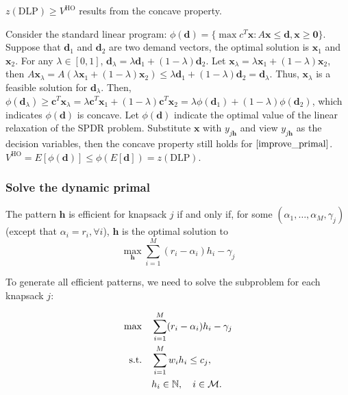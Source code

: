 \begin{lem}
$z(\text{DLP}) \geq V^{\text{HO}}$ results from the concave property. 
\end{lem}

Consider the standard linear program: $\phi(\bm{d})= \{\max c^{T} \bm{x}: A \bm{x} \leq \bm{d}, \bm{x} \geq \bm{0}\}$.  Suppose that $\bm{d}_1$ and $\bm{d}_2$ are two demand vectors, the optimal solution is $\bm{x}_1$ and $\bm{x}_2$. For any $\lambda \in [0, 1]$, $\bm{d}_{\lambda} = \lambda \bm{d}_{1} + (1- \lambda) \bm{d}_{2}$. Let $\bm{x}_{\lambda} = \lambda \bm{x}_{1} + (1-\lambda) \bm{x}_{2}$, then $A \bm{x}_{\lambda} = A(\lambda \bm{x}_{1} + (1-\lambda) \bm{x}_{2}) \leq \lambda \bm{d}_{1} + (1- \lambda) \bm{d}_{2} = \bm{d}_{\lambda}$. Thus, $\bm{x}_{\lambda}$ is a feasible solution for $\bm{d}_{\lambda}$. Then, $\phi(\bm{d}_{\lambda}) \geq \bm{c}^{T} \bm{x}_{\lambda} = \lambda \bm{c}^{T} \bm{x}_{1} + (1-\lambda) \bm{c}^{T} \bm{x}_{2} = \lambda \phi(\bm{d}_{1}) + (1- \lambda) \phi(\bm{d}_{2})$, which indicates $\phi(\bm{d})$ is concave. Let $\phi(\bm{d})$ indicate the optimal value of the linear relaxation of the SPDR problem. Substitute $\bm{x}$ with $y_{j \bm{h}}$ and view $y_{j \bm{h}}$ as the decision variables, then the concave property still holds for $\eqref{improve_primal}$. $V^{\text{HO}} = E[\phi(\bm{d})] \leq \phi(E[\bm{d}]) = z(\text{DLP})$.

\subsubsection{Solve the dynamic primal}

The pattern $\bm{h}$ is efficient for knapsack $j$ if and only if, for some $(\alpha_{1}, \ldots, \alpha_{M}, \gamma_{j})$ (except that $\alpha_{i} = r_i, \forall i$), $\bm{h}$ is the optimal solution to $$\max_{\bm{h}} \sum_{i=1}^{M} (r_i - \alpha_{i}) h_{i} - \gamma_{j}$$

To generate all efficient patterns, we need to solve the subproblem for each knapsack $j$:

\begin{align}\label{subproblem}
    \max \quad & \sum_{i=1}^{M} (r_i - \alpha_{i}) h_{i} - \gamma_{j} \\
    \text {s.t.} \quad & \sum_{i= 1}^{M} w_{i} h_{i} \leq c_j, \notag \\
    & h_{i} \in \mathbb{N}, \quad i \in \mathcal{M}. \notag
\end{align} 

